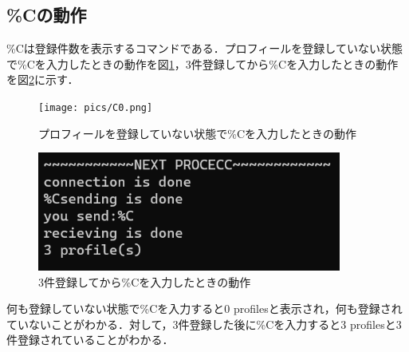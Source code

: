\documentclass[11pt,a4j,titlepage]{jsarticle}
\begin{document}
\subsection{\%Cの動作}
\%Cは登録件数を表示するコマンドである．プロフィールを登録していない状態で\%Cを入力したときの動作を図\ref{fig:c0}，3件登録してから\%Cを入力したときの動作を図\ref{fig:cn}に示す．
\begin{figure}[h]
\centering
\texttt{[image: pics/C0.png]}
\caption{プロフィールを登録していない状態で\%Cを入力したときの動作}
\label{fig:c0}\vspace{0zh}
\end{figure}
\begin{figure}[h]
\centering
\includegraphics[width=10cm]{pics/C3.png}
\caption{3件登録してから\%Cを入力したときの動作}
\label{fig:cn}\vspace{0zh}
\end{figure}

何も登録していない状態で\%Cを入力すると0 profilesと表示され，何も登録されていないことがわかる．対して，3件登録した後に\%Cを入力すると3 profilesと3件登録されていることがわかる．
\end{document}
